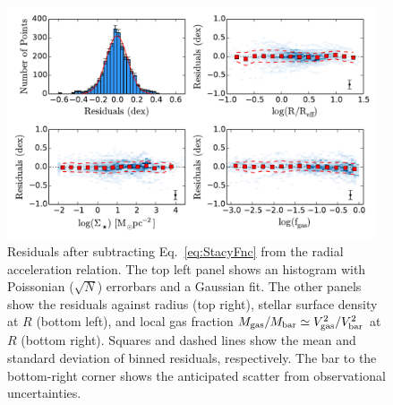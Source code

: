 \documentclass[apjl, twocolappendix]{emulateapj}
\begin{document}
\begin{figure}[thb]
\centering
\includegraphics[width=0.975\textwidth]{RAR_Res.pdf}
\caption{Residuals after subtracting Eq.~\ref{eq:StacyFnc} from the radial acceleration relation. The top left panel shows an histogram with Poissonian ($\sqrt{N}$) errorbars and a Gaussian fit. The other panels show the residuals against radius (top right), stellar surface density at $R$ (bottom left), and local gas fraction $M_{\rm gas}/M_{\rm bar}\simeq V_{\rm gas}^2/V_{\rm bar}^2$ at $R$ (bottom right). Squares and dashed lines show the mean and standard deviation of binned residuals, respectively. The bar to the bottom-right corner shows the anticipated scatter from observational uncertainties.}
\label{fig:RFRres}
\end{figure}
\end{document}
